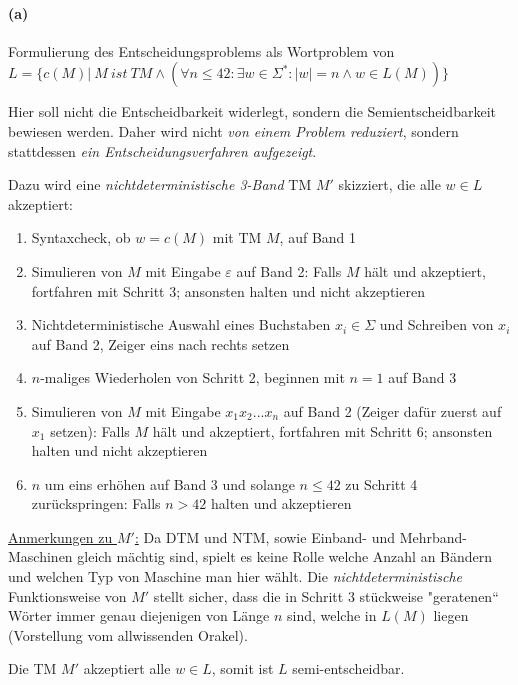 
\paragraph{(a)}
	Formulierung des Entscheidungsproblems als Wortproblem von\\
	$L=\{c(M)|\ M\ ist\ TM \wedge (\forall n \leq 42: \exists w \in \Sigma^*: |w|=n \wedge w \in L(M))\}$

	Hier soll nicht die Entscheidbarkeit widerlegt, sondern die Semientscheidbarkeit bewiesen werden. Daher wird nicht \textit{von einem Problem reduziert}, sondern stattdessen \textit{ein Entscheidungsverfahren aufgezeigt}.
	
	Dazu wird eine \textit{nichtdeterministische 3-Band} TM $M'$ skizziert, die alle $w \in L$ akzeptiert:
	\begin{enumerate}
		\item Syntaxcheck, ob $w=c(M)$ mit TM $M$, auf Band 1
		\item Simulieren von $M$ mit Eingabe $\varepsilon$ auf Band 2: Falls $M$ hält und akzeptiert, fortfahren mit Schritt 3; ansonsten halten und nicht akzeptieren
		\item Nichtdeterministische Auswahl eines Buchstaben $x_i \in \Sigma$ und Schreiben von $x_i$ auf Band 2, Zeiger eins nach rechts setzen
		\item $n$-maliges Wiederholen von Schritt 2, beginnen mit $n=1$ auf Band 3
		\item Simulieren von $M$ mit Eingabe $x_1x_2...x_n$ auf Band 2 (Zeiger dafür zuerst auf $x_1$ setzen): Falls $M$ hält und akzeptiert, fortfahren mit Schritt 6; ansonsten halten und nicht akzeptieren
		\item $n$ um eins erhöhen auf Band 3 und solange $n \leq 42$ zu Schritt 4 zurückspringen: Falls $n > 42$ halten und akzeptieren
	\end{enumerate}

	\underline{Anmerkungen zu $M'$:} Da DTM und NTM, sowie Einband- und Mehrband-Maschinen gleich mächtig sind, spielt es keine Rolle welche Anzahl an Bändern und welchen Typ von Maschine man hier wählt. Die \textit{nichtdeterministische} Funktionsweise von $M'$ stellt sicher, dass die in Schritt 3 stückweise "geratenen“ Wörter immer genau diejenigen von Länge $n$ sind, welche in $L(M)$ liegen (Vorstellung vom allwissenden Orakel).

	Die TM $M'$ akzeptiert alle $w \in L$, somit ist $L$ semi-entscheidbar.
	
